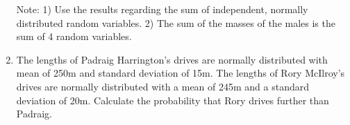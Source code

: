 \documentclass[]{article}
\begin{document}
\begin{enumerate}
	Note: 1) Use the results regarding the sum of independent, normally distributed random variables. 
	2)	The sum of the masses of the males is the sum of 4 random variables.

	\item 	The lengths of Padraig Harrington's drives are normally distributed with mean of 250m and standard deviation of 15m. The lengths of Rory McIlroy's drives are normally distributed with a mean of 245m and a standard deviation of 20m. Calculate the probability that Rory drives further than Padraig.
\end{enumerate}
\end{document}
